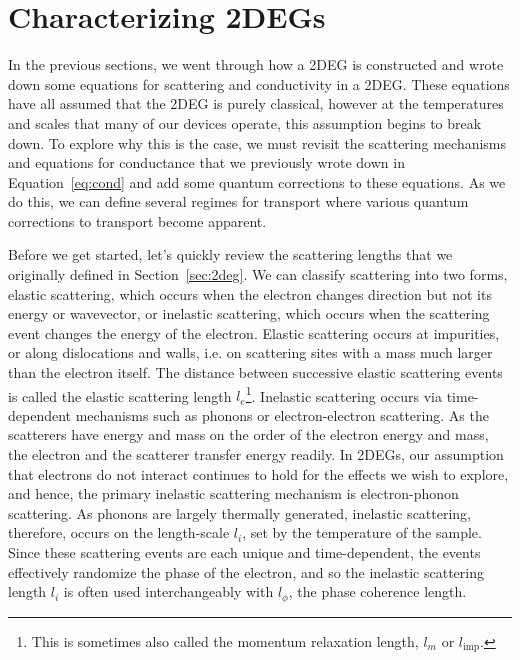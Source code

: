\section{Characterizing 2DEGs}
\label{sec:char}
In the previous sections, we went through how a 2DEG is constructed and wrote down some equations for scattering
and conductivity in a 2DEG. These equations have all assumed that the 2DEG is purely classical, however at the temperatures
and scales that many of our devices operate, this assumption begins to break down. To explore why this is the case,
we must revisit the scattering mechanisms and equations for conductance that we previously wrote down in Equation~\ref{eq:cond}
and add some quantum corrections to these equations. As we do this, we can define several regimes for transport
where various quantum corrections to transport become apparent.

Before we get started, let's quickly review the scattering lengths that we originally defined in Section~\ref{sec:2deg}. We can classify
scattering into two forms, elastic scattering, which occurs when the electron changes direction but not its energy or wavevector, or
inelastic scattering, which occurs when the scattering event changes the energy of the electron. Elastic scattering occurs at impurities, or along dislocations
and walls, i.e. on scattering sites with a mass much larger than the electron itself. The distance between successive elastic scattering events is
called the elastic scattering length $l_e$\footnote{This is sometimes also called the momentum relaxation length, $l_m$ or $l_{\textrm{imp}}$.}.
Inelastic scattering occurs via time-dependent mechanisms such as phonons or electron-electron scattering. As the scatterers have energy and
mass on the order of the electron energy and mass, the electron and the scatterer transfer energy readily. In 2DEGs, our assumption that
electrons do not interact continues to hold for the effects we wish to explore, and hence, the primary inelastic scattering mechanism is electron-phonon scattering.
As phonons are largely thermally generated, inelastic scattering, therefore, occurs on the length-scale $l_i$, set by the temperature of the sample. Since these scattering events
are each unique and time-dependent, the events effectively randomize the phase of the electron, and so
the inelastic scattering length $l_i$ is often used interchangeably with $l_\phi$, the phase coherence length.

